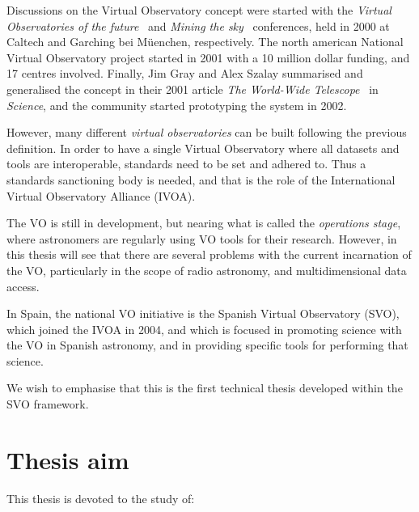 	 Discussions on the Virtual Observatory concept were started
	with the \emph{Virtual Observatories of the
	future}~\cite{2001ASPC..225.....B}
	and \emph{Mining the sky}~\cite{2001misk.conf..674G}
	conferences, held
	in 2000 at Caltech and Garching bei Müenchen, respectively.
 	The north american
	National Virtual Observatory project started in 2001 with a 
	10 million dollar funding, and 17 centres involved. Finally,
	Jim Gray and Alex Szalay summarised and generalised the concept
	in their 2001 article \emph{The World-Wide
	Telescope}~\cite{2001Sci...293.2037S} in \emph{Science}, and the
	community
	started prototyping the system in 2002.
	
	 However, many different \emph{virtual observatories} can be
	built following the previous definition.
	In order to have a single
	Virtual Observatory where all datasets and tools are
	interoperable, standards need to be set and adhered to. Thus a
	standards sanctioning body is needed, and that is the role of
	the International Virtual Observatory Alliance (IVOA).
	
	 The VO is still in development, but nearing what is called the
	\emph{operations stage}, where astronomers are regularly using
	VO tools for their research. However, in this thesis will see
	that there are several problems with the current incarnation of
	the VO, particularly in the scope of radio astronomy, and
	multidimensional data access.
	
	In Spain, the national VO initiative is the Spanish Virtual
	Observatory (SVO), which joined the IVOA in 2004, and which is
	focused in promoting science with the VO in Spanish astronomy,
	and in providing specific tools for performing that science.
	
	We wish to emphasise that this is the first technical thesis
	developed within the SVO framework.


\section{Thesis aim} %
\label{sec:thesis_aim}
	
	This thesis is devoted to the study of:

